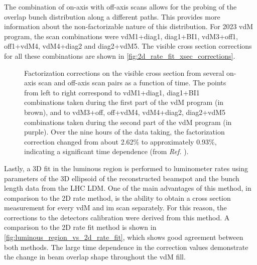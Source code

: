 The combination of on-axis with off-axis scans allows for the probing of the overlap bunch distribution along a different paths. This provides more information about the non-factorizable nature of this distribution. For 2023 vdM program, the scan combinations were vdM1+diag1, diag1+BI1, vdM3+off1, off1+vdM4, vdM4+diag2 and diag2+vdM5. The visible cross section corrections for all these combinations are shown in \autoref{fig:2d_rate_fit_xsec_corrections}.

\begin{figure}[!htb]
	\centering
	\caption[Factorization corrections on visible cross section from 2D rate fit method]{Factorization corrections on the visible cross section from several on-axis scan and off-axis scan pairs as a function of time. The points from left to right correspond to vdM1+diag1, diag1+BI1 combinations taken during the first part of the vdM program (in brown), and to vdM3+off, off+vdM4, vdM4+diag2, diag2+vdM5 combinations taken during the second part of the vdM program (in purple). Over the nine hours of the data taking, the factorization correction changed from about 2.62\% to approximately 0.93\%, indicating a significant time dependence (from \textit{Ref.} \cite{CMS-DP-2024-068}).}
	\label{fig:2d_rate_fit_xsec_corrections}
\end{figure}

Lastly, a 3D fit in the luminous region is performed to luminometer rates using parameters of the 3D ellipsoid of the reconstructed beamspot and the bunch length data from the LHC LDM. One of the main advantages of this method, in comparison to the 2D rate method, is the ability to obtain a cross section measurement for every vdM and im scan separately. For this reason, the corrections to the detectors calibration were derived from this method. A comparison to the 2D rate fit method is shown in \autoref{fig:luminous_region_vs_2d_rate_fit}, which shows good agreement between both methods. The large time dependence in the correction values demonstrate the change in beam overlap shape throughout the vdM fill.


